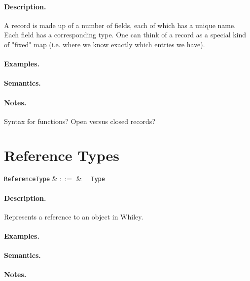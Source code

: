 \paragraph{Description.}   A record is made up of a number of fields,
each of which has a unique name. Each field has a corresponding
type. One can think of a record as a special kind of "fixed" map
(i.e. where we know exactly which entries we have).

\paragraph{Examples.}

\paragraph{Semantics.}

\paragraph{Notes.}  Syntax for functions?  Open versus closed records?


\section{Reference Types}

\begin{syntax}
  \verb+ReferenceType+ & $::=$ & \token{\&}\ \ \verb+Type+\\
\end{syntax}

\paragraph{Description.}  Represents a reference to an object in Whiley.

\paragraph{Examples.}

\paragraph{Semantics.}

\paragraph{Notes.}

